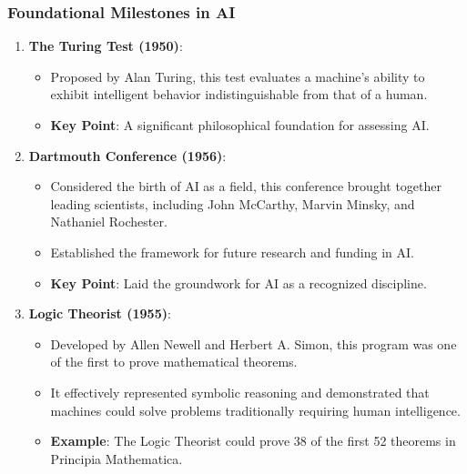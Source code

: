 \documentclass{beamer}
\begin{document}
\begin{frame}[fragile]
    \frametitle{Foundational Milestones in AI}
    \begin{enumerate}
        \item \textbf{The Turing Test (1950)}:
        \begin{itemize}
            \item Proposed by Alan Turing, this test evaluates a machine's ability to exhibit intelligent behavior indistinguishable from that of a human.
            \item \textbf{Key Point}: A significant philosophical foundation for assessing AI.
        \end{itemize}
        
        \item \textbf{Dartmouth Conference (1956)}:
        \begin{itemize}
            \item Considered the birth of AI as a field, this conference brought together leading scientists, including John McCarthy, Marvin Minsky, and Nathaniel Rochester.
            \item Established the framework for future research and funding in AI.
            \item \textbf{Key Point}: Laid the groundwork for AI as a recognized discipline.
        \end{itemize}
        
        \item \textbf{Logic Theorist (1955)}:
        \begin{itemize}
            \item Developed by Allen Newell and Herbert A. Simon, this program was one of the first to prove mathematical theorems.
            \item It effectively represented symbolic reasoning and demonstrated that machines could solve problems traditionally requiring human intelligence.
            \item \textbf{Example}: The Logic Theorist could prove 38 of the first 52 theorems in Principia Mathematica.
        \end{itemize}
    \end{enumerate}
\end{frame}
\end{document}

